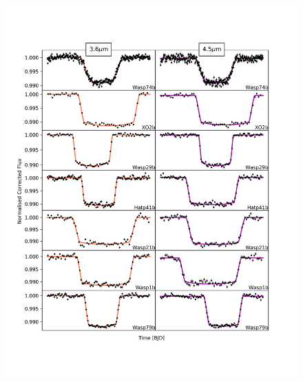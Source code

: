 \begin{subappendices}
  \addtocounter{figure}{-1}
  \begin{figure}
    \includegraphics[trim={0 2cm 0 0},clip,width=\textwidth]{CorrectedLighctuves1.pdf}
    \caption{}
    \label{P1:fig:normlc1}
  \end{figure}


\end{subappendices}
